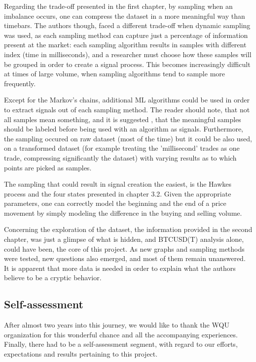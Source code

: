 Regarding the trade-off presented in the first chapter, by sampling when an imbalance occurs, one can compress the dataset in a more meaningful way than timebars. The authors though, faced a different trade-off when dynamic sampling was used, as each sampling method can capture just a percentage of information present at the market: each sampling algorithm results in samples with different index (time in milliseconds), and a researcher must choose how these samples will be grouped in order to create a signal process. This becomes increasingly difficult at times of large volume, when sampling algorithms tend to sample more frequently.

Except for the Markov's chains, additional ML algorithms could be used in order to extract signals out of each sampling method. The reader should note, that not all samples mean something, and it is suggested \cite{marcos}, that the meaningful samples should be labeled before being used with an algorithm as signals. Furthermore, the sampling occured on raw dataset (most of the time) but it could be also used, on a transformed dataset (for example treating the 'millisecond' trades as one trade, compressing significantly the dataset) with varying results as to which points are picked as samples.

The sampling that could result in signal creation the easiest, is the Hawkes process and the four states presented in chapter 3.2. Given the appropriate parameters, one can correctly model the beginning and the end of a price movement by simply modeling the difference in the buying and selling volume.

Concerning the exploration of the dataset, the information provided in the second chapter, was just a glimpse of what is hidden, and BTCUSD(T) analysis alone, could have been, the core of this project. As new graphs and sampling methods were tested, new questions also emerged, and most of them remain unanswered. It is apparent that more data is needed in order to explain what the authors believe to be a cryptic behavior.

\subsection{Self-assessment}

After almost two years into this journey, we would like to thank the WQU organization for this wonderful chance and all the accompanying experiences. Finally, there had to be a self-assessment segment, with regard to our efforts, expectations and results pertaining to this project.

